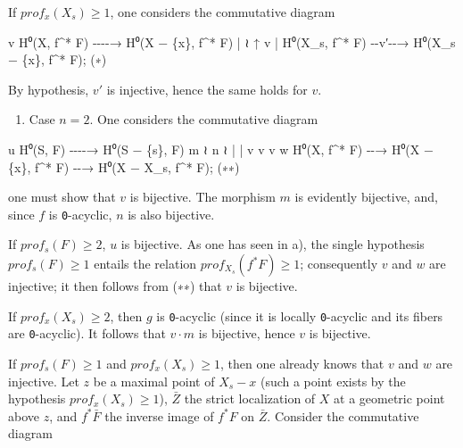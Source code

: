 \documentclass[
  11pt,
  a4paper,
]{book}
\newenvironment{Shaded}{}{}
\newcommand{\NormalTok}[1]{#1}
\providecommand{\tightlist}{%
  \setlength{\itemsep}{0pt}\setlength{\parskip}{0pt}}
\begin{document}
If \(prof_{x}(X_{s}) \geqslant 1\), one considers the commutative
diagram

\begin{Shaded}
\begin{Highlighting}[]
\NormalTok{                          v}
\NormalTok{H⁰(X, f\^{}* F)          {-}{-}{-}{-}→    H⁰(X − \{x\}, f\^{}* F)}
\NormalTok{    | ≀                            ↑}
\NormalTok{    v                              |}
\NormalTok{H⁰(X\_s, f\^{}* F)        {-}{-}v′{-}{-}→ H⁰(X\_s − \{x\}, f\^{}* F);}
\NormalTok{(∗)}
\end{Highlighting}
\end{Shaded}

By hypothesis, \(v'\) is injective, hence the same holds for \(v\).

\begin{enumerate}
\def\labelenumi{\alph{enumi})}
\setcounter{enumi}{1}
\tightlist
\item
  Case \(n = 2\). One considers the commutative diagram
\end{enumerate}

\begin{Shaded}
\begin{Highlighting}[]
\NormalTok{            u}
\NormalTok{H⁰(S, F)  {-}{-}{-}{-}→   H⁰(S − \{s\}, F)}
\NormalTok{   m ≀                  n ≀}
\NormalTok{   |                      |}
\NormalTok{   v                      v}
\NormalTok{            v                     w}
\NormalTok{H⁰(X, f\^{}* F) {-}{-}→ H⁰(X − \{x\}, f\^{}* F) {-}{-}→ H⁰(X − X\_s, f\^{}* F);}
\NormalTok{(∗∗)}
\end{Highlighting}
\end{Shaded}

one must show that \(v\) is bijective. The morphism \(m\) is evidently
bijective, and, since \(f\) is \texttt{0}-acyclic, \(n\) is also
bijective.

If \(prof_{s}(F) \geqslant 2\), \(u\) is bijective. As one has seen in
a), the single hypothesis \(prof_{s}(F) \geqslant 1\) entails the
relation \(prof_{X_{s}}(f^{*} F) \geqslant 1\); consequently \(v\) and
\(w\) are injective; it then follows from (∗∗) that \(v\) is bijective.

If \(prof_{x}(X_{s}) \geqslant 2\), then \(g\) is \texttt{0}-acyclic
(since it is locally \texttt{0}-acyclic and its fibers are
\texttt{0}-acyclic). It follows that \(v \cdot m\) is bijective, hence
\(v\) is bijective.

If \(prof_{s}(F) \geqslant 1\) and \(prof_{x}(X_{s}) \geqslant 1\), then
one already knows that \(v\) and \(w\) are injective. Let \(z\) be a
maximal point of \(X_{s} - {x}\) (such a point exists by the hypothesis
\(prof_{x}(X_{s}) \geqslant 1\)), \(\bar{Z}\) the strict localization of
\(X\) at a geometric point above \(z\), and \(f^{*} \bar{F}\) the
inverse image of \(f^{*}
F\) on \(\bar{Z}\). Consider the commutative diagram
\end{document}
